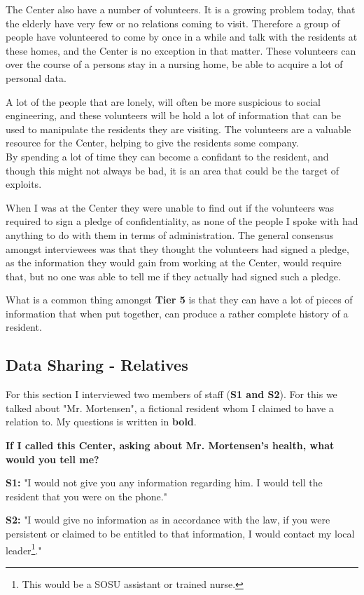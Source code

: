 \documentclass[11pt]{article}
\begin{document}
The Center also have a number of volunteers. It is a growing problem today, that the elderly have very few or no relations coming to visit. Therefore a group of people have volunteered to come by once in a while and talk with the residents at these homes, and the Center is no exception in that matter. These volunteers can over the course of a persons stay in a nursing home, be able to acquire a lot of personal data.

A lot of the people that are lonely, will often be more suspicious to social engineering, and these volunteers will be hold a lot of information that can be used to manipulate the residents they are visiting. The volunteers are a valuable resource for the Center, helping to give the residents some company.\\
By spending a lot of time they can become a confidant to the resident, and though this might not always be bad, it is an area that could be the target of exploits. 

When I was at the Center they were unable to find out if the volunteers was required to sign a pledge of confidentiality, as none of the people I spoke with had anything to do with them in terms of administration. The general consensus amongst interviewees was that they thought the volunteers had signed a pledge, as the information they would gain from working at the Center, would require that, but no one was able to tell me if they actually had signed such a pledge.

What is a common thing amongst \textbf{Tier 5} is that they can have a lot of pieces of information that when put together, can produce a rather complete history of a resident. 


\subsection{Data Sharing - Relatives}
For this section I interviewed two members of staff (\textbf{S1 and S2}). For this we talked about "Mr. Mortensen", a fictional resident whom I claimed to have a relation to. My questions is written in \textbf{bold}.

\textbf{If I called this Center, asking about Mr. Mortensen's health, what would you tell me?}

\textbf{S1:} "I would not give you any information regarding him. I would tell the resident that you were on the phone."

\textbf{S2:} "I would give no information as in accordance with the law, if you were persistent or claimed to be entitled to that information, I would contact my local leader\footnote{This would be a SOSU assistant or trained nurse.}."
\end{document}
